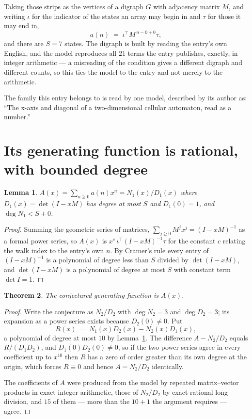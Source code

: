 \documentclass[11pt,a4paper]{article}
\theoremstyle{plain}
\newtheorem{theorem}{Theorem}
\newtheorem{lemma}[theorem]{Lemma}
\theoremstyle{definition}
\begin{document}
Taking those strips as the vertices of a digraph $G$ with adjacency matrix $M$, and writing
$\iota$ for the indicator of the states an array may begin in and $\tau$ for those it may end
in,
\[
a(n)\;=\;\iota^{\!\top}M^{\,n-0+0}\tau ,
\]
and there are $S=7$ states. The digraph is built by reading the entry's own English, and the
model reproduces all $21$ terms the entry publishes, exactly, in integer arithmetic --- a
misreading of the condition gives a different digraph and different counts, so this ties the
model to the entry and not merely to the arithmetic.

The family this entry belongs to is read by one model, described by its author as: ``The x-axis and diagonal of a two-dimensional cellular automaton, read as a number.''


\section{Its generating function is rational, with bounded degree}

\begin{lemma}\label{lem:rat}
$A(x)=\sum_{n\ge0}a(n)x^n=N_1(x)/D_1(x)$ where $D_1(x)=\det(I-xM)$ has degree at most
$S$ and $D_1(0)=1$, and $\deg N_1<S+0$.
\end{lemma}

\begin{proof}
Summing the geometric series of matrices, $\sum_{j\ge0}M^jx^j=(I-xM)^{-1}$ as a formal
power series, so $A(x)$ is $x^{c}\,\iota^{\!\top}(I-xM)^{-1}\tau$ for the constant $c$
relating the walk index to the entry's own $n$. By Cramer's rule every entry of
$(I-xM)^{-1}$ is a polynomial of degree less than $S$ divided by $\det(I-xM)$, and
$\det(I-xM)$ is a polynomial of degree at most $S$ with constant term $\det I=1$.
\end{proof}

\begin{theorem}
The conjectured generating function is $A(x)$.
\end{theorem}

\begin{proof}
Write the conjecture as $N_2/D_2$ with $\deg N_2=3$ and $\deg D_2=3$; its expansion as a
power series exists because $D_2(0)\neq0$. Put
\[
R(x)\;=\;N_1(x)D_2(x)-N_2(x)D_1(x),
\]
a polynomial of degree at most $10$ by Lemma~\ref{lem:rat}. The difference
$A-N_2/D_2$ equals $R/(D_1D_2)$, and $D_1(0)D_2(0)\neq0$, so if the two power series agree in
every coefficient up to $x^{10}$ then $R$ has a zero of order greater than its own
degree at the origin, which forces $R\equiv0$ and hence $A=N_2/D_2$ identically.

The coefficients of $A$ were produced from the model by repeated matrix--vector products in
exact integer arithmetic, those of $N_2/D_2$ by exact rational long division, and $15$
of them --- more than the $10+1$ the argument requires --- agree.
\end{proof}
\end{document}
